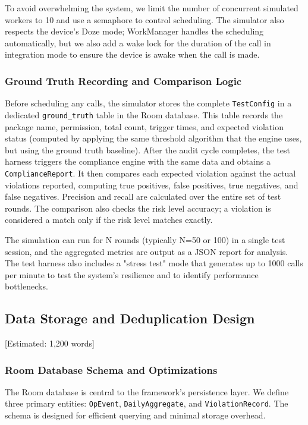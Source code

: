 To avoid overwhelming the system, we limit the number of concurrent simulated workers to 10 and use a semaphore to control scheduling. The simulator also respects the device's Doze mode; WorkManager handles the scheduling automatically, but we also add a wake lock for the duration of the call in integration mode to ensure the device is awake when the call is made.

\subsubsection{Ground Truth Recording and Comparison Logic}

Before scheduling any calls, the simulator stores the complete \texttt{TestConfig} in a dedicated \texttt{ground\_truth} table in the Room database. This table records the package name, permission, total count, trigger times, and expected violation status (computed by applying the same threshold algorithm that the engine uses, but using the ground truth baseline). After the audit cycle completes, the test harness triggers the compliance engine with the same data and obtains a \texttt{ComplianceReport}. It then compares each expected violation against the actual violations reported, computing true positives, false positives, true negatives, and false negatives. Precision and recall are calculated over the entire set of test rounds. The comparison also checks the risk level accuracy; a violation is considered a match only if the risk level matches exactly.

The simulation can run for N rounds (typically N=50 or 100) in a single test session, and the aggregated metrics are output as a JSON report for analysis. The test harness also includes a "stress test" mode that generates up to 1000 calls per minute to test the system's resilience and to identify performance bottlenecks.

\subsection{Data Storage and Deduplication Design} [Estimated: 1,200 words]

\subsubsection{Room Database Schema and Optimizations}

The Room database is central to the framework's persistence layer. We define three primary entities: \texttt{OpEvent}, \texttt{DailyAggregate}, and \texttt{ViolationRecord}. The schema is designed for efficient querying and minimal storage overhead.

